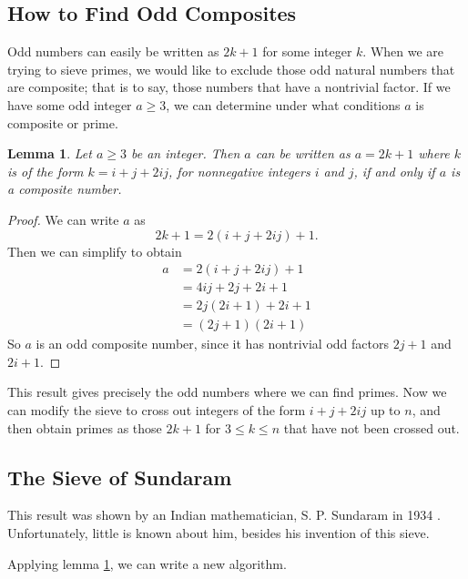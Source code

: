 \documentclass{amsart}
\newtheorem{lem}{Lemma}
\theoremstyle{definition}
\theoremstyle{case}
\begin{document}
	\subsection{How to Find Odd Composites}
	
	Odd numbers can easily be written as $2k+1$ for some integer $k$. When we are trying to sieve primes, we would like to exclude those odd natural numbers that are composite; that is to say, those numbers that have a nontrivial factor. If we have some odd integer $a\geq3$, we can determine under what conditions $a$ is composite or prime.
	
	\begin{lem}\label{ijstuff}
		Let $a\geq3$ be an integer. Then $a$ can be written as $a = 2k+1$ where $k$ is of the form $k=i+j+2ij$, for nonnegative integers $i$ and $j$, if and only if $a$ is a composite number.
	\end{lem}
	\begin{proof}
		We can write $a$ as
		$$ 2k + 1 = 2(i+j+2ij) + 1 . $$
		Then we can simplify to obtain
		\begin{equation*}
		\begin{split}
		a &= 2(i+j+2ij) + 1 \\
		  &= 4ij + 2j + 2i + 1 \\
		  &= 2j(2i+1) + 2i + 1 \\
		  &= (2j+1)(2i+1)
		\end{split}
		\end{equation*}
		So $a$ is an odd composite number, since it has nontrivial odd factors $2j+1$ and $2i+1$.
	\end{proof}

	This result gives precisely the odd numbers where we can find primes. Now we can modify the sieve to cross out integers of the form $i+j+2ij$ up to $n$, and then obtain primes as those $2k+1$ for $3 \leq k \leq n$ that have not been crossed out.
	
	\subsection{The Sieve of Sundaram}
	
	This result was shown by an Indian mathematician, S. P. Sundaram in 1934 \cite[p.~158]{ogilvyanderson}. Unfortunately, little is known about him, besides his invention of this sieve. 
	
	Applying lemma \ref{ijstuff}, we can write a new algorithm.
\end{document}
